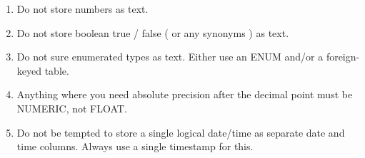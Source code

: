 \begin{enumerate}
  
\item Do not store numbers as text.

\item Do not store boolean true / false ( or any synonyms ) as text.

\item Do not sure enumerated types as text. Either use an ENUM and/or a foreign-keyed table.

\item Anything where you need absolute precision after the decimal point must be NUMERIC, not FLOAT. 
  
\item Do not be tempted to store a single logical date/time as separate date and time columns.
  Always use a single timestamp for this. 
  
\end{enumerate}

